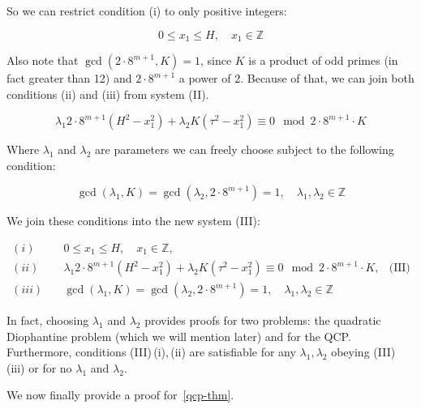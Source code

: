 \documentclass{amsart}
\theoremstyle{plain}
\begin{document}
So we can restrict condition (i) to only positive integers:

\begin{equation*}
  0\leq x_1\leq H, \quad x_1\in\mathbb{Z}
\end{equation*}

Also note that $\gcd(2\cdot 8^{m+1}, K)=1$, since $K$ is a product of odd primes (in fact greater
than 12) and $2\cdot 8^{m+1}$ a power of 2. Because of that, we can join both conditions (ii) and
(iii) from system (II).

\begin{equation*}
  \lambda_1 2\cdot 8^{m+1}(H^2-x_1^2)+\lambda_2 K(\tau^2-x_1^2)\equiv 0\mod 2\cdot 8^{m+1}\cdot K
\end{equation*}

Where $\lambda_1$ and $\lambda_2$ are parameters we can freely choose subject to the following
condition:

\begin{equation*}
  \gcd(\lambda_1,K)=\gcd(\lambda_2,2\cdot 8^{m+1})=1,\quad\lambda_1,\lambda_2\in\mathbb{Z}
\end{equation*}

We join these conditions into the new system (III):

\begin{align*}
  (i) \quad &0\leq x_1\leq H, \quad x_1\in\mathbb{Z},\\
  (ii) \quad &\lambda_1 2\cdot 8^{m+1}(H^2-x_1^2)+\lambda_2 K(\tau^2-x_1^2)\equiv 0\mod 2\cdot
    8^{m+1}\cdot K, &\text{(III)}\\
  (iii) \quad &\gcd(\lambda_1,K)=\gcd(\lambda_2,2\cdot 8^{m+1})=1,\quad\lambda_1,\lambda_2\in
    \mathbb{Z}
\end{align*}

In fact, choosing $\lambda_1$ and $\lambda_2$ provides proofs for two problems: the quadratic
Diophantine problem (which we will mention later) and for the QCP\@. Furthermore, conditions
(III)\,(i),\,(ii) are satisfiable for any $\lambda_1,\lambda_2$ obeying (III)\,(iii) or for no
$\lambda_1$ and $\lambda_2$.

We now finally provide a proof for~\autoref{qcp-thm}.
\end{document}
